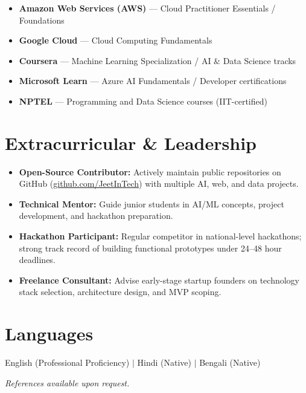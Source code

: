 \documentclass[11pt]{article}
\begin{document}
\begin{itemize}
  \item \textbf{Amazon Web Services (AWS)} --- Cloud Practitioner Essentials / Foundations
  \item \textbf{Google Cloud} --- Cloud Computing Fundamentals
  \item \textbf{Coursera} --- Machine Learning Specialization / AI \& Data Science tracks
  \item \textbf{Microsoft Learn} --- Azure AI Fundamentals / Developer certifications
  \item \textbf{NPTEL} --- Programming and Data Science courses (IIT-certified)
\end{itemize}

\section*{Extracurricular \& Leadership}
\begin{itemize}
  \item \textbf{Open-Source Contributor:} Actively maintain public repositories on GitHub (\href{https://github.com/JeetInTech}{github.com/JeetInTech}) with multiple AI, web, and data projects.
  \item \textbf{Technical Mentor:} Guide junior students in AI/ML concepts, project development, and hackathon preparation.
  \item \textbf{Hackathon Participant:} Regular competitor in national-level hackathons; strong track record of building functional prototypes under 24--48 hour deadlines.
  \item \textbf{Freelance Consultant:} Advise early-stage startup founders on technology stack selection, architecture design, and MVP scoping.
\end{itemize}

\section*{Languages}
English (Professional Proficiency) \quad $|$ \quad Hindi (Native) \quad $|$ \quad Bengali (Native)

\vfill
\begin{center}
  \small\textit{References available upon request.}
\end{center}
\end{document}
